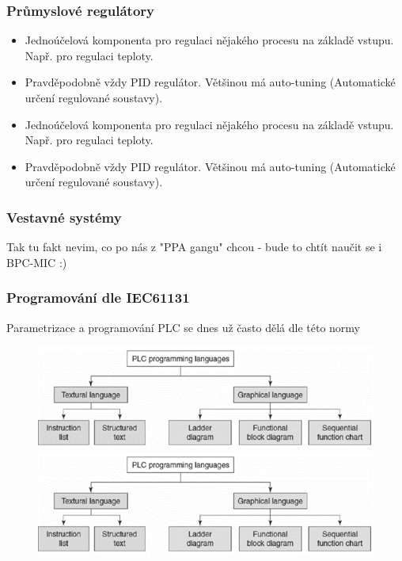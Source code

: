 \subsubsection*{Průmyslové regulátory}
\begin{itemize}
  \item Jednoúčelová komponenta pro regulaci nějakého procesu na základě vstupu. Např. pro regulaci teploty.
  \item Pravděpodobně vždy PID regulátor. Většinou má auto-tuning (Automatické určení regulované soustavy).
    \item Jednoúčelová komponenta pro regulaci nějakého procesu na základě vstupu. Např. pro regulaci teploty.
    \item Pravděpodobně vždy PID regulátor. Většinou má auto-tuning (Automatické určení regulované soustavy).
\end{itemize}

\subsubsection*{Vestavné systémy}
Tak tu fakt nevim, co po nás z "PPA gangu" chcou - bude to chtít naučit se i BPC-MIC :)

\subsubsection*{Programování dle IEC61131}
Parametrizace a programování PLC se dnes už často dělá dle této normy

\begin{figure}[h]
  \begin{center}
    \includegraphics[scale = 1]{img/Picture14.png}
  \end{center}
    \begin{center}
        \includegraphics[scale = 1]{img/Picture14.png}
    \end{center}
\end{figure}

